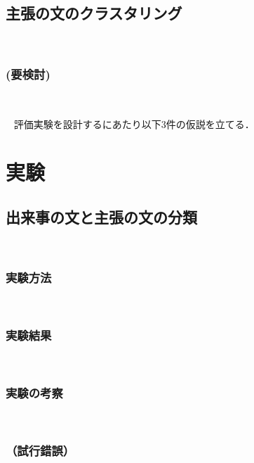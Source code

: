 \documentclass[12pt,a4j]{jreport}
\begin{document}
\section{主張の文のクラスタリング}
~

\subsection{(要検討)}
~


~%
 評価実験を設計するにあたり以下3件の仮説を立てる．


\chapter{実験}


\section{出来事の文と主張の文の分類}
~

\subsection{実験方法}
~

\subsection{実験結果}
~

\subsection{実験の考察}
~

\subsection{（試行錯誤）}
~
\end{document}
